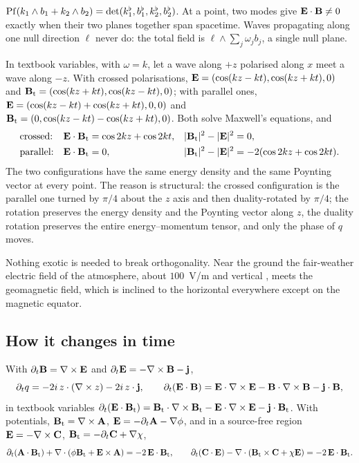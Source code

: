 \begin{proposition}
\label{prop:twomodes}
$\operatorname{Pf}(k_1\wedge b_1+k_2\wedge b_2)=\det(k_1^\flat,b_1^\flat,k_2^\flat,b_2^\flat)$. At a point, two modes give $\mathbf E\cdot\mathbf B\neq0$ exactly when
their two planes together span spacetime. Waves propagating along one null direction $\ell$ never do: the total field is
$\ell\wedge\sum_j\omega_jb_j$, a single null plane.
\end{proposition}

\begin{example}
\label{ex:counter}
In textbook variables, with $\omega=k$, let a wave along $+z$ polarised along $x$ meet a wave along $-z$. With crossed polarisations,
$\mathbf E=(\cos(kz-kt),\cos(kz+kt),0)$ and $\mathbf B_{\rm t}=(\cos(kz+kt),\cos(kz-kt),0)$; with parallel ones,
$\mathbf E=(\cos(kz-kt)+\cos(kz+kt),0,0)$ and $\mathbf B_{\rm t}=(0,\cos(kz-kt)-\cos(kz+kt),0)$. Both solve Maxwell's equations, and
\[
\begin{aligned}
&\text{crossed:}&& \mathbf E\cdot\mathbf B_{\rm t}=\cos2kz+\cos2kt, && |\mathbf B_{\rm t}|^2-|\mathbf E|^2=0,\\
&\text{parallel:}&& \mathbf E\cdot\mathbf B_{\rm t}=0, && |\mathbf B_{\rm t}|^2-|\mathbf E|^2=-2(\cos2kz+\cos2kt).
\end{aligned}
\]
The two configurations have the same energy density and the same Poynting vector at every point. The reason is structural: the crossed
configuration is the parallel one turned by $\pi/4$ about the $z$ axis and then duality-rotated by $\pi/4$; the rotation preserves the
energy density and the Poynting vector along $z$, the duality rotation preserves the entire energy--momentum tensor, and only the phase
of $q$ moves.
\end{example}

Nothing exotic is needed to break orthogonality. Near the ground the fair-weather electric field of the atmosphere, about $100$~V/m
and vertical \cite{FeynmanII}, meets the geomagnetic field, which is inclined to the horizontal everywhere except on the magnetic
equator.

\subsection{How it changes in time}

\begin{proposition}
\label{prop:EBlocal}
With $\partial_t\mathbf B=\nabla\times\mathbf E$ and $\partial_t\mathbf E=-\nabla\times\mathbf B-\mathbf j$,
\[
\partial_tq=-2i\,z\cdot(\nabla\times z)-2i\,z\cdot\mathbf j,\qquad \partial_t(\mathbf E\cdot\mathbf B)=\mathbf E\cdot\nabla\times\mathbf E-\mathbf B\cdot\nabla\times\mathbf B-\mathbf j\cdot\mathbf B ,
\]
in textbook variables $\partial_t(\mathbf E\cdot\mathbf B_{\rm t})=\mathbf B_{\rm t}\cdot\nabla\times\mathbf B_{\rm t}-\mathbf E\cdot\nabla\times\mathbf E-\mathbf j\cdot\mathbf B_{\rm t}$. With potentials,
$\mathbf B_{\rm t}=\nabla\times\mathbf A$, $\mathbf E=-\partial_t\mathbf A-\nabla\phi$, and in a source-free region $\mathbf E=-\nabla\times\mathbf C$, $\mathbf B_{\rm t}=-\partial_t\mathbf C+\nabla\chi$,
\[
\partial_t(\mathbf A\cdot\mathbf B_{\rm t})+\nabla\cdot(\phi\mathbf B_{\rm t}+\mathbf E\times\mathbf A)=-2\,\mathbf E\cdot\mathbf B_{\rm t},\qquad
\partial_t(\mathbf C\cdot\mathbf E)-\nabla\cdot(\mathbf B_{\rm t}\times\mathbf C+\chi\mathbf E)=-2\,\mathbf E\cdot\mathbf B_{\rm t} .
\]
\end{proposition}

